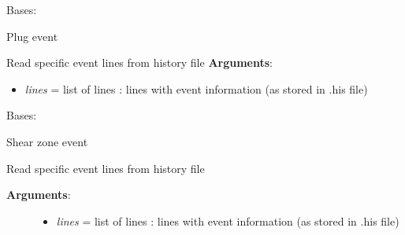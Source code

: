 \documentclass[a4paper,10pt,english]{sphinxmanual}
\begin{document}

\begin{fulllineitems}
\label{pynoddy:pynoddy.events.Plug}
Bases: {\hyperref[pynoddy:pynoddy.events.Event]{\emph{}}}

Plug event

\begin{fulllineitems}
\label{pynoddy:pynoddy.events.Plug.parse_event_lines}
Read specific event lines from history file
\textbf{Arguments}:
\begin{itemize}
\item {} 
\emph{lines} = list of lines : lines with event information (as stored in .his file)

\end{itemize}

\end{fulllineitems}


\end{fulllineitems}


\begin{fulllineitems}
\label{pynoddy:pynoddy.events.Shear}
Bases: {\hyperref[pynoddy:pynoddy.events.Event]{\emph{}}}

Shear zone event

\begin{fulllineitems}
\label{pynoddy:pynoddy.events.Shear.parse_event_lines}
Read specific event lines from history file
\begin{description}
\item[{\textbf{Arguments}:}] \leavevmode\begin{itemize}
\item {} 
\emph{lines} = list of lines : lines with event information (as stored in .his file)

\end{itemize}

\end{description}

\end{fulllineitems}


\end{fulllineitems}
\end{document}

